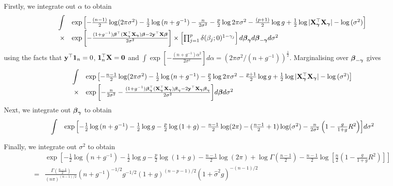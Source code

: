 \documentclass{amsart}[12pt]
\theoremstyle{definition}
\begin{document}
\noindent Firstly, we integrate out $\alpha$ to obtain
$$
\begin{array}{rl}
		\displaystyle \int & \exp{\left[
		-\frac{(n - 1)}{2} \log (2 \pi \sigma^2) 
		-\frac{1}{2} \log{(n + g^{-1})} 
		-\frac{n}{2 \sigma^2}
		-\frac{p}{2} \log{2\pi \sigma^2} 
		-\frac{(p + 1)}{2} \log{g} 
		+\frac{1}{2} \log{|{\bf X}_{\boldsymbol\gamma}^\top {\bf X}_{\boldsymbol\gamma}|}
		-\log{(\sigma^2)}
		\right]}\\
		\times&\exp{\left[
		-\frac{(1 + g^{-1}){\boldsymbol\beta}^\top ({\bf X}_{\boldsymbol\gamma}^\top {\bf X}_{\boldsymbol\gamma}) {\boldsymbol\beta}- 2 {\bf y}^\top {\bf X}{\boldsymbol\beta}}{2 \sigma^{2}} 
		\right]} 
		\times \left[ \prod_{j=1}^p \delta(\beta_j; 0)^{1 - \gamma_j} \right] d {\boldsymbol \beta}_{{\boldsymbol \gamma}} d {\boldsymbol \beta}_{-{\boldsymbol \gamma}} d \sigma^2
\end{array}
$$
using the facts that ${\bf y}^\top {\bf1}_n = 0$, ${\bf 1}_n^\top {\bf X} = {\bf 0}$ and $\int \exp{\left[-\frac{(n + g^{-1})\alpha^2}{2 \sigma^{2}} \right]} d \alpha = (2 \pi \sigma^{2} / (n + g^{-1}))^{\frac{1}{2}}$.
Marginalising over ${\boldsymbol \beta}_{-{\boldsymbol \gamma}}$ gives
$$
\begin{array}{rl}
		\displaystyle \int &\exp{\left[
		-\frac{n - 1}{2} \log (2 \pi \sigma^2) 
		- \frac{1}{2} \log{(n + g^{-1})}
		-\frac{p}{2} \log{2\pi \sigma^2} 
		- \frac{p + 1}{2} \log{g}
		+ \frac{1}{2} \log{|{\bf X}_{\boldsymbol\gamma}^\top {\bf X}_{\boldsymbol\gamma}|} 
		-\log{(\sigma^2)}
		\right]} \\
		\times&\exp{\left[
		-\frac{n}{2 \sigma^2}
		-\frac{(1 + g^{-1}){\boldsymbol\beta}_{\boldsymbol\gamma}^\top ({\bf X}_{\boldsymbol\gamma}^\top {\bf X}_{\boldsymbol\gamma}) {\boldsymbol\beta}_{\boldsymbol\gamma}- 2{\bf y}^\top{\bf X}_{\boldsymbol\gamma}{\boldsymbol\beta}_{\boldsymbol\gamma}}{2 \sigma^{2}} \right]} d {\boldsymbol \beta} d \sigma^2
\end{array}
$$
\noindent Next, we integrate out ${\boldsymbol \beta}_{{\boldsymbol \gamma}}$ to obtain
$$
\begin{array}{rl}
		\displaystyle \int &\exp{\left[
		- \frac{1}{2} \log{(n + g^{-1})}
		- \frac{1}{2} \log{g}
		-\frac{p}{2} \log{(1 + g)}
		-\frac{n - 1}{2} \log (2 \pi)
		-(\frac{n - 1}{2} + 1) \log (\sigma^2) 
		-\frac{n}{2 \sigma^2} \left(1 - \frac{g}{1 + g} R^2\right)
		\right]}  d \sigma^2
\end{array}
$$

\noindent Finally, we integrate out $\sigma^2$ to obtain
$$
\begin{array}{rl}
		&\exp{\left[
		- \frac{1}{2} \log{(n + g^{-1})}
		- \frac{1}{2} \log{g}
		-\frac{p}{2} \log{(1 + g)}
		-\frac{n - 1}{2} \log (2 \pi)
		+\log \Gamma(\frac{n-1}{2})
		-\frac{n-1}{2}\log{[\frac{n}{2} (1 - \frac{g}{1 + g} R^2)]}
		\right]} \\
		=&\frac{\Gamma(\frac{n - 1}{2})}{(n \pi)^{(n-1)/2}}
		(n + g^{-1})^{-1/2} g^{-1/2} (1 + g)^{(n - p - 1)/2} (1 + \widehat{\sigma}^2 g)^{-(n - 1)/2}
\end{array}
$$
\end{document}
